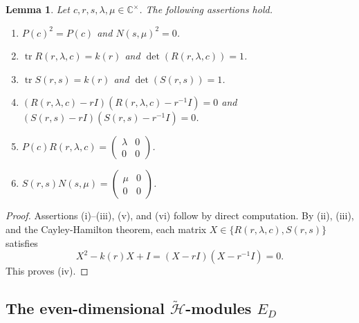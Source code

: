 \documentclass[reqno]{amsart}
\newtheorem{lemma}[theorem]{Lemma}
\theoremstyle{definition}
\begin{document}
\begin{lemma}\label{local block lemma}
%
Let $c,r,s,\lambda,\mu \in \mathbb{C}^{\times}$.
The following assertions hold.
\begin{enumerate}
\item[\rm(i)]
$P(c)^2=P(c)$ and $N(s,\mu)^2=0$.
\item[\rm(ii)]
$\operatorname{tr} R(r,\lambda,c)=k(r)$ and
$\det(R(r,\lambda,c))=1$.
\item[\rm(iii)]
$\operatorname{tr} S(r,s)=k(r)$ and
$\det(S(r,s))=1$.
\item[\rm(iv)]
$(R(r,\lambda,c)-rI)(R(r,\lambda,c)-r^{-1}I)=0$ and
$(S(r,s)-rI)(S(r,s)-r^{-1}I)=0$.
\item[\rm(v)]
$P(c)R(r,\lambda,c)=
\begin{pmatrix}
\lambda&0\\
0&0
\end{pmatrix}$.
\item[\rm(vi)]
$S(r,s)N(s,\mu)=
\begin{pmatrix}
\mu&0\\
0&0
\end{pmatrix}$.
\end{enumerate}
%
\end{lemma}

\begin{proof}
%
Assertions (i)--(iii), (v), and (vi) follow by direct computation.
By (ii), (iii), and the Cayley-Hamilton theorem, each matrix
$X\in\{R(r,\lambda,c),S(r,s)\}$
satisfies
$$
X^2-k(r)X+I=(X-rI)(X-r^{-1}I)=0.
$$
This proves (iv).
%
\end{proof}



\subsection{The even-dimensional $\widetilde{\mathcal{H}}$-modules $E_D$}\label{even subsec}
\end{document}
